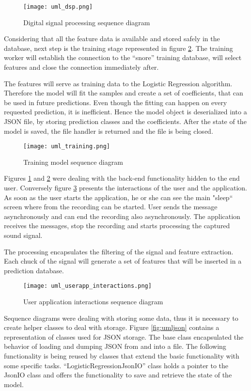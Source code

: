 \begin{figure}[!ht]
\centering
  \texttt{[image: uml\_dsp.png]}
\caption{Digital signal processing sequence diagram}
\label{fig:umldsp}
\end{figure}

Considering that all the feature data is available and stored safely in the database, next step is the training stage represented in figure \ref{fig:umltraining}. The training worker will establish the connection to the ``snore'' training database, will select features and close the connection immediately after. 

The features will serve as training data to the Logistic Regression algorithm. Therefore the model will fit the samples and create a set of coefficients, that can be used in future predictions. Even though the fitting can happen on every requested prediction, it is inefficient. Hence the model object is deserialized into a JSON file, by storing prediction classes and the coefficients. After the state of the model is saved, the file handler is returned and the file is being closed. 

\begin{figure}[!ht]
\centering
  \texttt{[image: uml\_training.png]}
\caption{Training model sequence diagram}
\label{fig:umltraining}
\end{figure}

Figures \ref{fig:umldsp} and \ref{fig:umltraining} were dealing with the back-end functionality hidden to the end user. Conversely figure \ref{fig:umluserapp} presents the interactions of the user and the application. As soon as the user starts the application, he or she can see the main "sleep`` screen where from the recording can be started. User sends the message asynchronously and can end the recording also asynchronously. The application receives the messages, stop the recording and starts processing the captured sound signal. 

The processing encapsulates the filtering of the signal and feature extraction. Each chuck of the signal will generate a set of features that will be inserted in a prediction database. 

\begin{figure}[!ht]
\centering
  \texttt{[image: uml\_userapp\_interactions.png]}
\caption{User application interactions sequence diagram}
\label{fig:umluserapp}
\end{figure}

Sequence diagrams were dealing with storing some data, thus it is necessary to create helper classes to deal with storage. Figure \ref{fig:umljson} contains a representation of classes used for JSON storage. The base class encapsulated the behavior of loading and dumping JSON from and into a file. The following functionality is being reused by classes that extend the basic functionality with some specific tasks. ``LogisticRegressionJsonIO'' class holds a pointer to the JsonIO class and offers the functionality to save and retrieve the state of the model.

